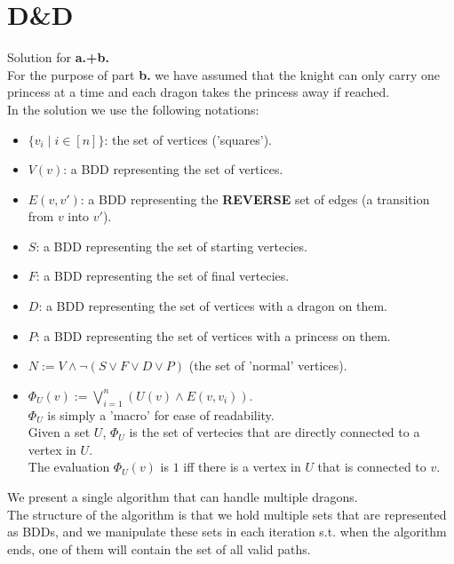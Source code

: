 \documentclass{article}
\begin{document}

\section{D\&D}
Solution for \textbf{a.+b.}\\
For the purpose of part \textbf{b.} we have assumed 
that the knight can only carry one princess at a time
and each dragon takes the princess away if reached.\\

In the solution we use the following notations:
\begin{itemize}
    \item $\{v_i\mid i\in[n]\}$: the set of vertices ('squares').
    \item $V(v)$: a BDD representing the set of vertices.
    \item $E(v,v')$: a BDD representing the \textbf{REVERSE} set of edges (a transition from $v$ into $v'$).
    \item $S$: a BDD representing the set of starting vertecies.
    \item $F$: a BDD representing the set of final vertecies.
    \item $D$: a BDD representing the set of vertices with a dragon on them.
    \item $P$: a BDD representing the set of vertices with a princess on them.
    \item $N:=V\wedge\neg(S\vee F\vee D\vee P)$ (the set of 'normal' vertices).
    \item $\Phi_U(v):=\bigvee_{i=1}^n(U(v)\wedge E(v,v_i))$.\\
        $\Phi_U$ is simply a 'macro' for ease of readability.\\
        Given a set $U$, $\Phi_U$ is the set of vertecies that are directly connected to a vertex in $U$.\\
        The evaluation $\Phi_U(v)$ is $1$ iff there is a vertex in $U$ that is connected to $v$.
\end{itemize}

We present a single algorithm that can handle multiple dragons.\\
The structure of the algorithm is that we hold
multiple sets that are represented as BDDs, and we manipulate
these sets in each iteration s.t. when the algorithm ends,
one of them will contain the set of all valid paths.\\
\end{document}
